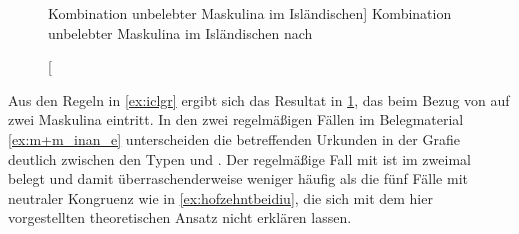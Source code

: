 \begin{figure}
\centering
\caption%
	[Kombination unbelebter Maskulina im Isländischen]%
	{Kombination unbelebter Maskulina im Isländischen nach
	\textcites[578]{wechsler2009}[186]{wechslerzlatic2003}}
\label{fig:iclgr}
\end{figure}

Aus den Regeln in \cref{ex:iclgr} ergibt sich das Resultat in \cref{fig:iclgr},
das beim Bezug von  auf zwei Maskulina eintritt. In den zwei
regelmäßigen Fällen im Belegmaterial \cref{ex:m+m_inan_e} unterscheiden die
betreffenden Urkunden in der Grafie deutlich zwischen den Typen  und
. Der regelmäßige Fall mit  ist im \CAO{} zweimal
belegt und damit über\-raschender\-weise weniger häufig als die fünf Fälle mit
neutraler Kongruenz wie in \cref{ex:hofzehntbeidiu}, die sich mit dem hier
vorgestellten theoretischen Ansatz nicht erklären lassen.

